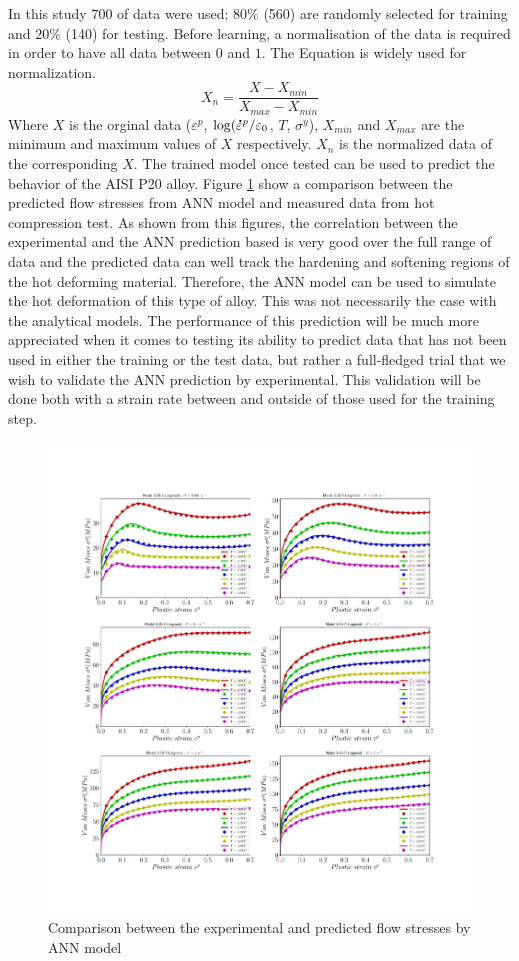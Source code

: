 \documentclass[twoside,english,1p,final,sort&compress]{elsarticle}
\theoremstyle{plain}
\newcommand{\mdot}[1]{\accentset{\mbox{\bfseries .}}{#1}}
\begin{document}
In this study $700$ of data were used; $80\%$ (560) are randomly selected for training and $20\%$ (140) for testing. Before learning, a normalisation of the data is required in order to have all data between $0$ and $1$. The Equation is widely used for normalization.
\begin{equation}
X_n = \frac{X - X_{min}}{X_{max} - X_{min}}
\end{equation}
Where $X$ is the orginal data ($\varepsilon^p$, $\log(\mdot{\varepsilon}^p/\varepsilon_0$,  $T$, $\sigma^y$), $X_{min}$ and $X_{max}$ are the minimum and maximum values of $X$ respectively. $X_n$ is the normalized data of the corresponding $X$. The trained model once tested can be used to predict the behavior of the AISI P20 alloy. Figure \ref{fig:iCorrelationANN} show a comparison between the predicted ﬂow stresses from ANN model and measured data from hot compression test. As shown from this figures, the correlation between the experimental and the ANN prediction based is very good over the full range of data and the predicted data can well track the hardening and softening regions of the hot deforming material. Therefore, the ANN model can be used to simulate the hot deformation of this type of alloy. This was not necessarily the case with the analytical models. The performance of this prediction will be much more appreciated when it comes to testing its ability to predict data that has not been used in either the training or the test data, but rather a full-fledged trial that we wish to validate the ANN prediction by experimental. This validation will be done both with a strain rate between and outside of those used for the training step.
\begin{figure}[!ht]
\centering
\includegraphics[width=1\columnwidth]
{Figures/CompExpANN}
\caption{Comparison between the experimental and predicted flow stresses by ANN model }
\label{fig:iCorrelationANN}
\end{figure}
\end{document}
